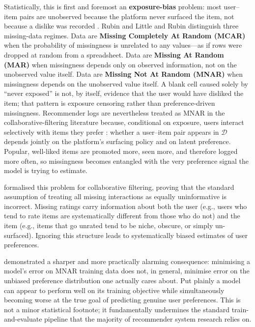\documentclass[11pt,a4paper]{report}
\begin{document}
Statistically, this is first and foremost an \textbf{exposure-bias} problem: most user--item pairs are unobserved because the platform never surfaced the item, not because a dislike was recorded \citep{schnabel2016ips, marlin2009mnar}. Rubin \citep{rubin1976inference} and Little and Rubin \citep{little2002statistical} distinguish three missing-data regimes. Data are \textbf{Missing Completely At Random (MCAR)} when the probability of missingness is unrelated to any values---as if rows were dropped at random from a spreadsheet. Data are \textbf{Missing At Random (MAR)} when missingness depends only on observed information, not on the unobserved value itself. Data are \textbf{Missing Not At Random (MNAR)} when missingness depends on the unobserved value itself. A blank cell caused solely by ``never exposed'' is not, by itself, evidence that the user would have disliked the item; that pattern is exposure censoring rather than preference-driven missingness. Recommender logs are nevertheless treated as MNAR in the collaborative-filtering literature because, conditional on exposure, users interact selectively with items they prefer \citep{marlin2009mnar, steck2010training}: whether a user--item pair appears in $\mathcal{D}$ depends jointly on the platform's surfacing policy and on latent preference. Popular, well-liked items are promoted more, seen more, and therefore logged more often, so missingness becomes entangled with the very preference signal the model is trying to estimate.

\citet{marlin2009mnar} formalised this problem for collaborative filtering, proving that the standard assumption of treating all missing interactions as equally uninformative is incorrect. Missing ratings carry information about both the user (e.g., users who tend to rate items are systematically different from those who do not) and the item (e.g., items that go unrated tend to be niche, obscure, or simply un-surfaced). Ignoring this structure leads to systematically biased estimates of user preferences.

\citet{steck2010training} demonstrated a sharper and more practically alarming consequence: minimising a model's error on MNAR training data does not, in general, minimise error on the unbiased preference distribution one actually cares about. Put plainly a model can appear to perform well on its training objective while simultaneously becoming worse at the true goal of predicting genuine user preferences. This is not a minor statistical footnote; it fundamentally undermines the standard train-and-evaluate pipeline that the majority of recommender system research relies on.
\end{document}
